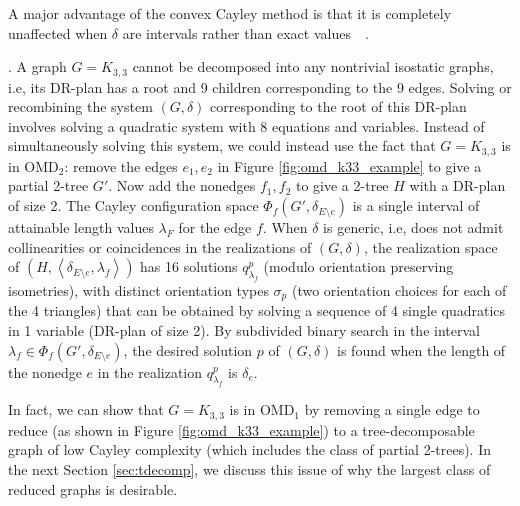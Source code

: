 \noindent
\note A major advantage of the convex Cayley method is that it is
completely unaffected when $\delta$ are intervals rather than exact
values~~\cite{sitharam2010convex}.

.
A graph $G=K_{3,3}$  cannot be decomposed into any nontrivial
isostatic graphs, i.e, its DR-plan has a root and 9 children
corresponding to the 9 edges. Solving or recombining the system
$(G,\delta)$ corresponding to the root of this DR-plan involves
solving a quadratic system with 8 equations and variables. Instead of
simultaneously solving this system, we could instead use the fact that
$G=K_{3,3}$ is in OMD$_2$: remove the edges $e_1,e_2$ in Figure
\ref{fig:omd_k33_example} to give a partial 2-tree $G'$. Now add the
nonedges $f_1,f_2$ to give a 2-tree $H$ with a DR-plan of size 2. The Cayley
configuration space $\Phi_f(G', \delta_{E\setminus e})$ is a single
interval of attainable length values $\lambda_F$ for the edge $f$.
When $\delta$ is generic, i.e, does not admit collinearities or
coincidences in the realizations of $(G,\delta)$, the realization
space of $(H, \left<\delta_{E\setminus e}, \lambda_f\right>)$ has 16
solutions $q^p_{\lambda_f}$ (modulo orientation preserving
isometries), with distinct orientation types $\sigma_p$ (two
orientation choices for each of the 4 triangles) that can be obtained
by solving a sequence of 4 single quadratics in 1 variable (DR-plan of
size 2). By subdivided binary search in the interval $\lambda_f \in
\Phi_f(G', \delta_{E\setminus e})$, the desired solution $p$  of
$(G,\delta)$ is found when the length of the nonedge $e$ in  the
realization $q^p_{\lambda_f}$ is $\delta_e$.

In fact, we can show that $G=K_{3,3}$ is in OMD$_1$ by removing a single
edge to reduce (as shown in Figure \ref{fig:omd_k33_example}) to a
tree-decomposable graph of low Cayley complexity (which includes the class
of partial 2-trees).
In the next Section \ref{sec:tdecomp}, we discuss this issue
of why the largest class of reduced graphs is desirable.
%
